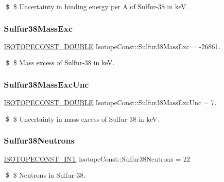 \$ \$ Uncertainty in binding energy per A of Sulfur-\/38 in keV. \mbox{\label{group___isotope_const-_sulfur-_s38_gaad4367e0f764d799797c7dcd50d7de85}} 
\subsubsection{\texorpdfstring{Sulfur38\+Mass\+Exc}{Sulfur38MassExc}}
{\footnotesize\ttfamily \mbox{\hyperlink{group___isotope_const-_macros_ga8f45a7272ce02c0b4c65c44636ed719a}{I\+S\+O\+T\+O\+P\+E\+C\+O\+N\+S\+T\+\_\+\+D\+O\+U\+B\+LE}} Isotope\+Const\+::\+Sulfur38\+Mass\+Exc = -\/26861.}

\$ \$ Mass excess of Sulfur-\/38 in keV. \mbox{\label{group___isotope_const-_sulfur-_s38_gac279fbe5327f125ebcb9ca6a23a2a57e}} 
\subsubsection{\texorpdfstring{Sulfur38\+Mass\+Exc\+Unc}{Sulfur38MassExcUnc}}
{\footnotesize\ttfamily \mbox{\hyperlink{group___isotope_const-_macros_ga8f45a7272ce02c0b4c65c44636ed719a}{I\+S\+O\+T\+O\+P\+E\+C\+O\+N\+S\+T\+\_\+\+D\+O\+U\+B\+LE}} Isotope\+Const\+::\+Sulfur38\+Mass\+Exc\+Unc = 7.}

\$ \$ Uncertainty in mass excess of Sulfur-\/38 in keV. \mbox{\label{group___isotope_const-_sulfur-_s38_ga2284f22c6bdb458987d37fc4c6e631b7}} 
\subsubsection{\texorpdfstring{Sulfur38\+Neutrons}{Sulfur38Neutrons}}
{\footnotesize\ttfamily \mbox{\hyperlink{group___isotope_const-_macros_ga5f18360b3e99483a35c32d789e62621c}{I\+S\+O\+T\+O\+P\+E\+C\+O\+N\+S\+T\+\_\+\+I\+NT}} Isotope\+Const\+::\+Sulfur38\+Neutrons = 22}

\$ \$ Neutrons in Sulfur-\/38. \mbox{\label{group___isotope_const-_sulfur-_s38_gabca8a5a7d85157b99fdb560c899cc767}} 
